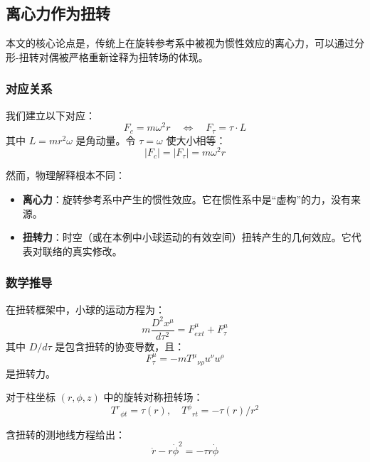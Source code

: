 \documentclass[12pt,a4paper]{article}
\begin{document}
\subsection{离心力作为扭转}

本文的核心论点是，传统上在旋转参考系中被视为惯性效应的离心力，可以通过分形-扭转对偶被严格重新诠释为扭转场的体现。

\subsubsection{对应关系}

我们建立以下对应：
\begin{equation}
    F_c = m\omega^2 r \quad \Longleftrightarrow \quad F_\tau = \tau \cdot L
\end{equation}
其中 $L = mr^2\omega$ 是角动量。令 $\tau = \omega$ 使大小相等：
\begin{equation}
    |F_c| = |F_\tau| = m\omega^2 r
\end{equation}

然而，物理解释根本不同：
\begin{itemize}
    \item \textbf{离心力}：旋转参考系中产生的惯性效应。它在惯性系中是``虚构''的力，没有来源。
    \item \textbf{扭转力}：时空（或在本例中小球运动的有效空间）扭转产生的几何效应。它代表对联络的真实修改。
\end{itemize}

\subsubsection{数学推导}

在扭转框架中，小球的运动方程为：
\begin{equation}
    m\frac{D^2 x^\mu}{d\tau^2} = F^\mu_{ext} + F^\mu_\tau
\end{equation}
其中 $D/d\tau$ 是包含扭转的协变导数，且：
\begin{equation}
    F^\mu_\tau = -mT^\mu{}_{\nu\rho}u^\nu u^\rho
\end{equation}
是扭转力。

对于柱坐标 $(r, \phi, z)$ 中的旋转对称扭转场：
\begin{equation}
    T^r{}_{\phi t} = \tau(r), \quad T^\phi{}_{rt} = -\tau(r)/r^2
\end{equation}

含扭转的测地线方程给出：
\begin{equation}
    \ddot{r} - r\dot{\phi}^2 = -\tau r \dot{\phi}
\end{equation}
\end{document}
